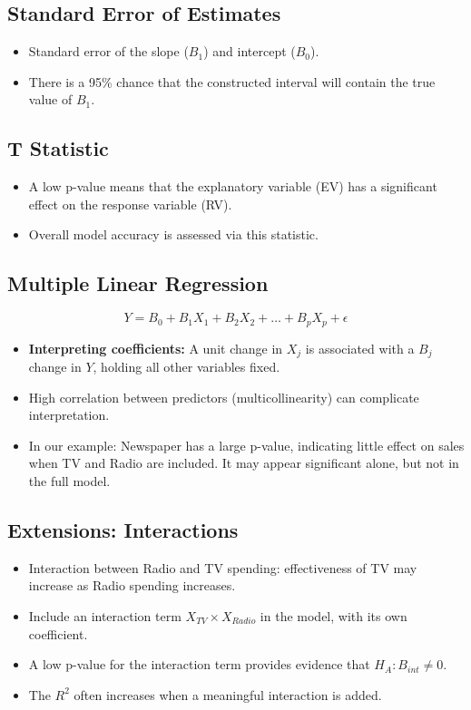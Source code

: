\documentclass{article}
\begin{document}
\subsection{Standard Error of Estimates}
\begin{itemize}
    \item Standard error of the slope ($B_1$) and intercept ($B_0$).
    \item There is a 95\% chance that the constructed interval will contain the true value of $B_1$.
\end{itemize}

\subsection{T Statistic}
\begin{itemize}
    \item A low p-value means that the explanatory variable (EV) has a significant effect on the response variable (RV).
    \item Overall model accuracy is assessed via this statistic.
\end{itemize}

\subsection{Multiple Linear Regression}
\[
Y = B_0 + B_1 X_1 + B_2 X_2 + \dots + B_p X_p + \epsilon
\]
\begin{itemize}
    \item \textbf{Interpreting coefficients:} A unit change in $X_j$ is associated with a $B_j$ change in $Y$, holding all other variables fixed.
    \item High correlation between predictors (multicollinearity) can complicate interpretation.
    \item In our example: Newspaper has a large p-value, indicating little effect on sales when TV and Radio are included. It may appear significant alone, but not in the full model.
\end{itemize}

\subsection{Extensions: Interactions}
\begin{itemize}
    \item Interaction between Radio and TV spending: effectiveness of TV may increase as Radio spending increases.
    \item Include an interaction term $X_{TV}\times X_{Radio}$ in the model, with its own coefficient.
    \item A low p-value for the interaction term provides evidence that $H_A: B_{int} \neq 0$.
    \item The $R^2$ often increases when a meaningful interaction is added.
\end{itemize}
\end{document}
